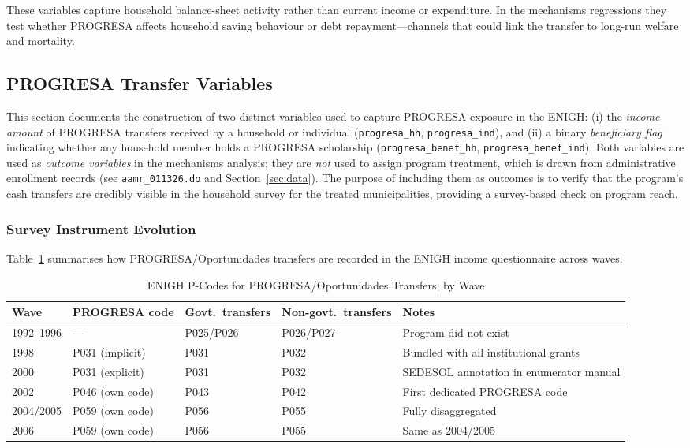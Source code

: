 These variables capture household balance-sheet activity rather than current
income or expenditure. In the mechanisms regressions they test whether PROGRESA
affects household saving behaviour or debt repayment---channels that could link
the transfer to long-run welfare and mortality.

\subsection{PROGRESA Transfer Variables}
\label{app:enigh_progresa}

This section documents the construction of two distinct variables used to
capture PROGRESA exposure in the ENIGH: (i) the \textit{income amount} of
PROGRESA transfers received by a household or individual (\texttt{progresa\_hh},
\texttt{progresa\_ind}), and (ii) a binary \textit{beneficiary flag} indicating
whether any household member holds a PROGRESA scholarship
(\texttt{progresa\_benef\_hh}, \texttt{progresa\_benef\_ind}). Both variables
are used as \textit{outcome variables} in the mechanisms analysis; they are
\textit{not} used to assign program treatment, which is drawn from
administrative enrollment records (see \texttt{aamr\_011326.do} and
Section~\ref{sec:data}). The purpose of including them as outcomes is to verify
that the program's cash transfers are credibly visible in the household survey
for the treated municipalities, providing a survey-based check on program reach.

\subsubsection{Survey Instrument Evolution}
\label{app:enigh_evolution}

Table~\ref{tab:enigh_pcodes} summarises how PROGRESA/Oportunidades transfers
are recorded in the ENIGH income questionnaire across waves.

\begin{table}[h!]
\centering
\caption{ENIGH P-Codes for PROGRESA/Oportunidades Transfers, by Wave}
\label{tab:enigh_pcodes}
\small
\begin{tabular}{lllll}
\hline\hline
Wave & PROGRESA code & Govt.\ transfers & Non-govt.\ transfers & Notes \\
\hline
1992--1996 & --- & P025/P026 & P026/P027 & Program did not exist \\
1998       & P031 (implicit) & P031 & P032 & Bundled with all institutional grants \\
2000       & P031 (explicit) & P031 & P032 & SEDESOL annotation in enumerator manual \\
2002       & P046 (own code) & P043 & P042 & First dedicated PROGRESA code \\
2004/2005  & P059 (own code) & P056 & P055 & Fully disaggregated \\
2006       & P059 (own code) & P056 & P055 & Same as 2004/2005 \\
\hline\hline
\end{tabular}
\end{table}

